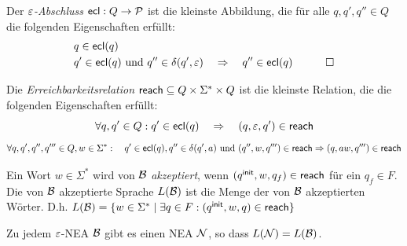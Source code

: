 \begin{Def}
 Der \emph{$\varepsilon$-Abschluss} $\textsf{ecl}:Q\rightarrow\mathcal{P}$ ist die kleinste Abbildung, die für alle $q,q',q''\in Q$ die folgenden Eigenschaften erfüllt:
 \begin{eqnarray*}
  & q\in\textsf{ecl}(q) &\\
  & q'\in\textsf{ecl}(q) \text{ und } q''\in\delta(q',\varepsilon) \quad\Rightarrow\quad q''\in\textsf{ecl}(q) & \qedhere
 \end{eqnarray*}
\end{Def}

\begin{Def}
 Die \emph{Erreichbarkeitsrelation} $\textsf{reach}\subseteq Q\times\Sigma^*\times Q$ ist die kleinste Relation, die die folgenden Eigenschaften erfüllt:
$$\forall q,q'\in Q: q'\in\textsf{ecl}(q) \quad\Rightarrow\quad (q,\varepsilon,q')\in\textsf{reach}$$
$$\forall q,q',q'',q'''\in Q, w\in\Sigma^*: \quad q'\in\textsf{ecl}(q), q''\in\delta(q',a) \text{ und } (q'',w,q''')\in\textsf{reach} \Rightarrow (q,aw,q''')\in\textsf{reach}$$
\end{Def}

\begin{Def}
 Ein Wort $w\in\Sigma^*$ wird von $\mathcal{B}$ \emph{akzeptiert}, wenn $({q^\mathsf{init}},w,q_f)\in\textsf{reach}$ für ein $q_f\in F$.
 Die von $\mathcal{B}$ akzeptierte Sprache $L(\mathcal{B})$ ist die Menge der von $\mathcal{B}$ akzeptierten Wörter. D.h.	
	$L(\mathcal{B})=\{ w\in\Sigma^* \mid \exists q\in F: ({q^\mathsf{init}}, w, q)\in\textsf{reach} \}$
\end{Def}



\begin{Satz}
    Zu jedem $\varepsilon$-NEA $\mathcal{B}$ gibt es einen \ac{NEA} $\mathcal{N}$, so dass $L(\mathcal{N})=L(\mathcal{B})$.
\end{Satz}

